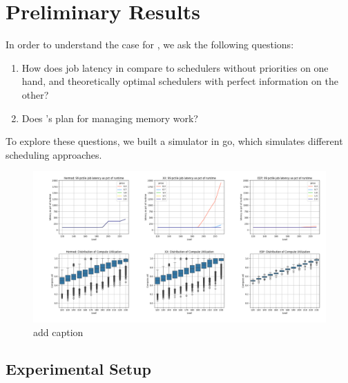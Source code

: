 \section{Preliminary Results}



In order to understand the case for \sys{}, we ask the following questions: 
\begin{enumerate}
    \item How does job latency in \sys{} compare to schedulers without
    priorities on one hand, and theoretically optimal schedulers with perfect
    information on the other?
    \item Does \sys{}'s plan for managing memory work?
\end{enumerate}


To explore these questions, we built a simulator in go\cite{golang}, which
simulates different scheduling approaches.

\begin{figure}[t!]
    \centering
      \includegraphics[width=16cm]{img/hermod_xx_edf_latencies.png}
      \caption{ add caption }
    \label{fig:hermod-xx-edf}
\end{figure}


\subsection{Experimental Setup}

